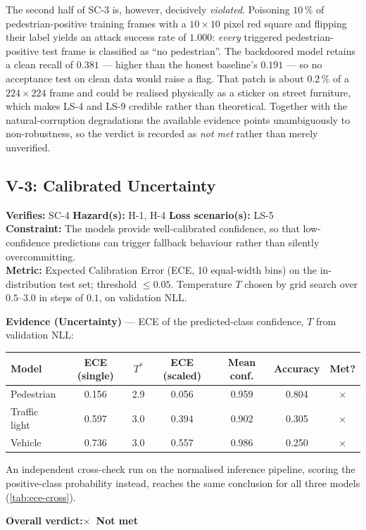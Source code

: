 \documentclass[a4paper,12pt]{article}
\makeatletter
\newcommand{\verdictnotmet}{\textbf{\color{mls@red}$\times$~Not met}}
\newcommand{\verdictline}[1]{\textbf{Overall verdict:}\quad #1}
\newcommand{\no}{{\color{mls@red}$\times$}}
\makeatother
\begin{document}
The second half of SC-3 is, however, decisively \emph{violated}. Poisoning $10\,\%$ of
pedestrian-positive training frames with a $10\times10$ pixel red square and flipping their
label yields an attack success rate of $1.000$: \emph{every} triggered pedestrian-positive
test frame is classified as ``no pedestrian''. The backdoored model retains a clean recall
of $0.381$ --- higher than the honest baseline's $0.191$ --- so no acceptance test on clean
data would raise a flag. That patch is about $0.2\,\%$ of a $224\times224$ frame and could
be realised physically as a sticker on street furniture, which makes LS-4 and LS-9 credible
rather than theoretical. Together with the natural-corruption degradations the available
evidence points unambiguously to non-robustness, so the verdict is recorded as \emph{not
met} rather than merely unverified.


\subsection{V-3: Calibrated Uncertainty}

\begin{mdframed}[style=subclaim]
\textbf{Verifies:} SC-4 \quad \textbf{Hazard(s):} H-1, H-4 \quad
\textbf{Loss scenario(s):} LS-5\\
\textbf{Constraint:} The models provide well-calibrated confidence, so that
low-confidence predictions can trigger fallback behaviour rather than silently
overcommitting.\\
\textbf{Metric:} Expected Calibration Error (ECE, 10 equal-width bins) on the
in-distribution test set; threshold $\leq 0.05$. Temperature $T$ chosen by grid search
over $0.5$--$3.0$ in steps of $0.1$, on validation NLL.
\end{mdframed}

\begin{mdframed}[style=evidencestyle]
\textbf{Evidence (Uncertainty)} --- ECE of the predicted-class confidence,
$T$ from validation NLL:\\

\centering
\footnotesize
\begin{tabular}{@{}lcccccc@{}}
\toprule
\textbf{Model} & \textbf{ECE (single)} & \textbf{$T^{*}$} & \textbf{ECE (scaled)} &
\textbf{Mean conf.} & \textbf{Accuracy} & \textbf{Met?} \\
\midrule
Pedestrian    & 0.156 & 2.9 & 0.056 & 0.959 & 0.804 & \no \\
Traffic light & 0.597 & 3.0 & 0.394 & 0.902 & 0.305 & \no \\
Vehicle       & 0.736 & 3.0 & 0.557 & 0.986 & 0.250 & \no \\
\bottomrule
\end{tabular}

\bigskip
An independent cross-check run on the normalised inference pipeline, scoring the
positive-class probability instead, reaches the same conclusion for all three models
(\cref{tab:ece-cross}).

\bigskip
\verdictline{\verdictnotmet}
\end{mdframed}
\end{document}
